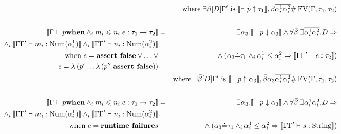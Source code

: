 \documentclass{article}
\newcommand{\tmop}[1]{\ensuremath{\operatorname{#1}}}
\newcommand{\tmstrong}[1]{\textbf{#1}}
\begin{document}
\begin{table}[t]
\begin{eqnarray*}
    &  & \text{where } \exists \bar{\beta} [D] \Gamma^{\prime} \text{ is }
    \llbracket \vdash p \uparrow \tau_1 \rrbracket, \bar{\beta}
    \overline{\alpha^1_i \alpha^2_i} \# \tmop{FV} (\Gamma, \tau_1, \tau_2)\\
    &  & \\
    \left\llbracket \Gamma \vdash p \text{{\tmstrong{when}}} \wedge_i m_i
    \leqslant n_i .e : \tau_1 \rightarrow \tau_2 \right\rrbracket & = &
    \exists \alpha_3 . \llbracket \vdash p \downarrow \alpha_3 \rrbracket
    \wedge \forall \bar{\beta} . \exists \overline{\alpha^1_i \alpha^2_i} .D
    \Rightarrow \\
    \text{ \ \ \ \ \ } \wedge_i \llbracket \Gamma \Gamma^{\prime} \vdash m_i
    : \tmop{Num} (\alpha^1_i) \rrbracket \wedge_i \llbracket \Gamma
    \Gamma^{\prime} \vdash n_i : \tmop{Num} (\alpha^2_i) \rrbracket\\
    \text{when } e = \text{{\tmstrong{assert false}}} \vee \ldots \vee &  &
    \text{ \ \ \ \ \ } \wedge (\alpha_3 \dot{=} \tau_1 \wedge_i \alpha^1_i
    \leq \alpha^2_i \Rightarrow \llbracket \Gamma \Gamma^{\prime} \vdash e :
    \tau_2 \rrbracket)\\
    e = \lambda \left( p^{\prime} \ldots \lambda \left( p^{\prime\prime} .
    \text{{\tmstrong{assert false}}} \right) \right) &  & \\
    &  & \text{where } \exists \bar{\beta} [D] \Gamma^{\prime} \text{ is }
    \llbracket \vdash p \uparrow \alpha_3 \rrbracket, \bar{\beta} \alpha_3
    \overline{\alpha^1_i \alpha^2_i} \# \tmop{FV} (\Gamma, \tau_1, \tau_2)\\
    &  & \\
    \left\llbracket \Gamma \vdash p \text{{\tmstrong{when}}} \wedge_i m_i
    \leqslant n_i .e : \tau_1 \rightarrow \tau_2 \right\rrbracket & = &
    \exists \alpha_3 . \llbracket \vdash p \downarrow \alpha_3 \rrbracket
    \wedge \forall \bar{\beta} . \exists \overline{\alpha^1_i \alpha^2_i} .D
    \Rightarrow \\
    \text{ \ \ \ \ \ } \wedge_i \llbracket \Gamma \Gamma^{\prime} \vdash m_i
    : \tmop{Num} (\alpha^1_i) \rrbracket \wedge_i \llbracket \Gamma
    \Gamma^{\prime} \vdash n_i : \tmop{Num} (\alpha^2_i) \rrbracket\\
    \text{when } e = \text{{\tmstrong{runtime failure}}} s &  & \text{ \ \ \ \
    \ } \wedge (\alpha_3 \dot{=} \tau_1 \wedge_i \alpha^1_i \leq \alpha^2_i
    \Rightarrow \llbracket \Gamma \Gamma^{\prime} \vdash s : \tmop{String}
    \rrbracket)\\

\end{eqnarray*}
\end{table}
\end{document}

